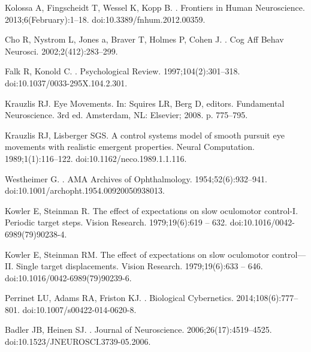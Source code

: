 \documentclass[10pt,letterpaper]{article}
\begin{document}
\begin{thebibliography}{10}
Kolossa A, Fingscheidt T, Wessel K, Kopp B.
.
\newblock Frontiers in Human Neuroscience. 2013;6(February):1--18.
\newblock doi:{10.3389/fnhum.2012.00359}.

Cho R, Nystrom L, Jones a, Braver T, Holmes P, Cohen J.
.
\newblock Cog Aff Behav Neurosci. 2002;2(412):283--299.

Falk R, Konold C.
.
\newblock Psychological Review. 1997;104(2):301--318.
\newblock doi:{10.1037/0033-295X.104.2.301}.

Krauzlis RJ.
\newblock Eye Movements.
\newblock In: Squires LR, Berg D, editors. Fundamental Neuroscience. 3rd ed. Amsterdam,
  NL: Elsevier; 2008. p. 775--795.

Krauzlis RJ, Lisberger SGS.
\newblock A control systems model of smooth pursuit eye movements with
  realistic emergent properties.
\newblock Neural Computation. 1989;1(1):116--122.
\newblock doi:{10.1162/neco.1989.1.1.116}.

Westheimer G.
.
\newblock AMA Archives of Ophthalmology. 1954;52(6):932--941.
\newblock doi:{10.1001/archopht.1954.00920050938013}.

Kowler E, Steinman R.
\newblock The effect of expectations on slow oculomotor control-I. Periodic
  target steps.
\newblock Vision Research. 1979;19(6):619 -- 632.
\newblock doi:{10.1016/0042-6989(79)90238-4}.

Kowler E, Steinman RM.
\newblock The effect of expectations on slow oculomotor control---II. Single
  target displacements.
\newblock Vision Research. 1979;19(6):633 -- 646.
\newblock doi:{10.1016/0042-6989(79)90239-6}.

Perrinet LU, Adams RA, Friston KJ.
.
\newblock Biological Cybernetics. 2014;108(6):777--801.
\newblock doi:{10.1007/s00422-014-0620-8}.

Badler JB, Heinen SJ.
.
\newblock Journal of Neuroscience. 2006;26(17):4519--4525.
\newblock doi:{10.1523/JNEUROSCI.3739-05.2006}.


\end{thebibliography}
\end{document}
